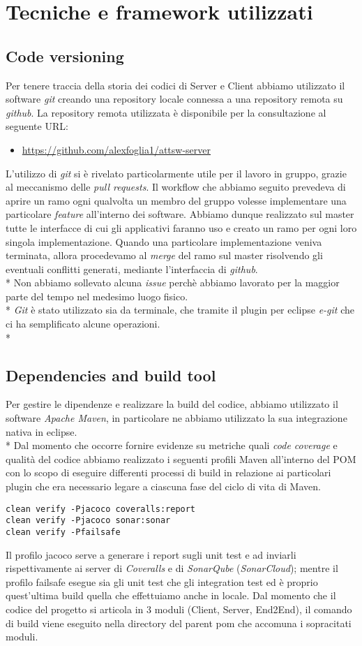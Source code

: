 \chapter{Tecniche e framework utilizzati}
\section{Code versioning}
Per tenere traccia della storia dei codici di Server e Client abbiamo utilizzato il software \emph{git} creando una repository locale connessa a una repository remota su \emph{github}. La repository remota utilizzata \`e disponibile per la consultazione al seguente URL:
\begin{itemize}
	\item \url{https://github.com/alexfoglia1/attsw-server}
\end{itemize}
L'utilizzo di \emph{git} si \`e rivelato particolarmente utile per il lavoro in gruppo, grazie al meccanismo delle \emph{pull requests}. Il workflow che abbiamo seguito prevedeva di aprire un ramo ogni qualvolta un membro del gruppo volesse implementare una particolare \emph{feature} all'interno dei software. Abbiamo dunque realizzato sul master tutte le interfacce di cui gli applicativi faranno uso e creato un ramo per ogni loro singola implementazione. Quando una particolare implementazione veniva terminata, allora procedevamo al \emph{merge} del ramo sul master risolvendo gli eventuali conflitti generati, mediante l'interfaccia di \emph{github}.\\*
Non abbiamo sollevato alcuna \emph{issue} perch\`e abbiamo lavorato per la maggior parte del tempo nel medesimo luogo fisico.\\*
\emph{Git} \`e stato utilizzato sia da terminale, che tramite il plugin per eclipse \emph{e-git} che ci ha semplificato alcune operazioni.\\*
\section{Dependencies and build tool}
Per gestire le dipendenze e realizzare la build del codice, abbiamo utilizzato il software \emph{Apache Maven}, in particolare ne abbiamo utilizzato la sua integrazione nativa in eclipse.\\*
Dal momento che occorre fornire evidenze su metriche quali \emph{code coverage} e qualit\`a del codice abbiamo realizzato i seguenti profili Maven all'interno del POM con lo scopo di eseguire differenti processi di build in relazione ai particolari plugin che era necessario legare a ciascuna fase del ciclo di vita di Maven.
\begin{lstlisting}
clean verify -Pjacoco coveralls:report
clean verify -Pjacoco sonar:sonar
clean verify -Pfailsafe
\end{lstlisting}
Il profilo jacoco serve a generare i report sugli unit test e ad inviarli rispettivamente ai server di \emph{Coveralls} e di \emph{SonarQube} (\emph{SonarCloud}); mentre il profilo failsafe esegue sia gli unit test che gli integration test ed \`e proprio quest'ultima build quella che effettuiamo anche in locale. Dal momento che il codice del progetto si articola in 3 moduli (Client, Server, End2End), il comando di build viene eseguito nella directory del parent pom che accomuna i sopracitati moduli.
